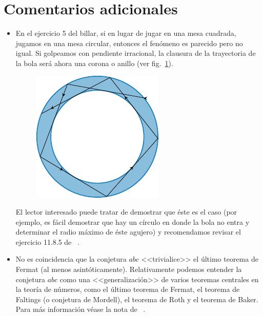 \documentclass[11pt, reqno]{amsart}
\begin{document}
\section{Comentarios adicionales}
\begin{itemize}
	\item En el ejercicio 5 del billar, si en lugar de jugar en una mesa cuadrada, jugamos en una mesa circular, entonces el fenómeno es parecido pero no igual.
		Si golpeamos con pendiente irracional, la clausura de la trayectoria de la bola será ahora una corona o anillo (ver fig.~\ref{fig:billard_circle}).
		\begin{figure}[!hbt]
			\centering
			\includegraphics[scale=1]{../billard_circle.pdf}
			\caption{}%
			\label{fig:billard_circle}
		\end{figure}

		El lector interesado puede tratar de demostrar que éste es el caso (por ejemplo, es fácil demostrar que hay un círculo en donde la bola no entra
		y determinar el radio máximo de éste agujero) y recomendamos revisar el ejercicio 11.8.5 de
		\citeauthor{granville:masterclass}~\cite[422]{granville:masterclass}.

	\item No es coincidencia que la conjetura $abc$ <<trivialice>> el último teorema de Fermat (al menos asintóticamente).
		Relativamente podemos entender la conjetura $abc$ como una <<generalización>> de varios teoremas centrales en la teoría de números,
		como el último teorema de Fermat, el teorema de Faltings (o conjetura de Mordell), el teorema de Roth y el teorema de Baker.
		Para más información véase la nota de \citeauthor{granville2002abc}~\cite{granville2002abc}.


\end{itemize}
\end{document}
